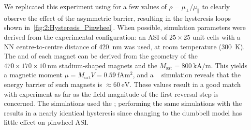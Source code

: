 We replicated this experiment using \hotspice for a few values of $\rho=\mu_\perp/\mu_\parallel$ to clearly observe the effect of the asymmetric barrier, resulting in the hysteresis loops shown in~\cref{fig:2:Hysteresis_Pinwheel}.
When possible, simulation parameters were derived from the experimental configuration: an ASI of $25 \times 25$ unit cells with a NN centre-to-centre distance of \SI{420}{\nano\meter} was used, at room temperature (\SI{300}{\kelvin}).
The  and  of each magnet can be derived from the geometry of the $470\times170\times\SI{10}{\nano\metre}$ stadium-shaped magnets and the   $M_\mathrm{sat}=\SI{800}{\kilo\ampere\per\metre}$.
This yields a magnetic moment $\mu = M_\mathrm{sat} V = \SI{0.59}{\femto\ampere\metre\squared}$, and a \mumax~\cite{mumax3} simulation reveals that the energy barrier of such magnets is $\approx \SI{60}{\electronvolt}$.
These values result in a good match with experiment as far as the field magnitude of the first reversal step is concerned.
The simulations used the ; performing the same simulations with the  results in a nearly identical hysteresis since changing to the dumbbell model has little effect on pinwheel ASI. \\\par

